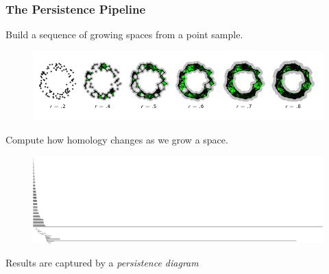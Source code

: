 \begin{frame}
\frametitle{The Persistence Pipeline}
\noindent Build a sequence of growing spaces from a point sample.
\begin{figure}[h!]
\includegraphics[width=\textwidth]{filtration}
\end{figure}
\noindent Compute how homology changes as we grow a space. 
\begin{figure}[h!]
\includegraphics[width=\textwidth]{barcodes}
\end{figure}
Results are captured by a \emph{persistence diagram}
\vfill
\end{frame}

